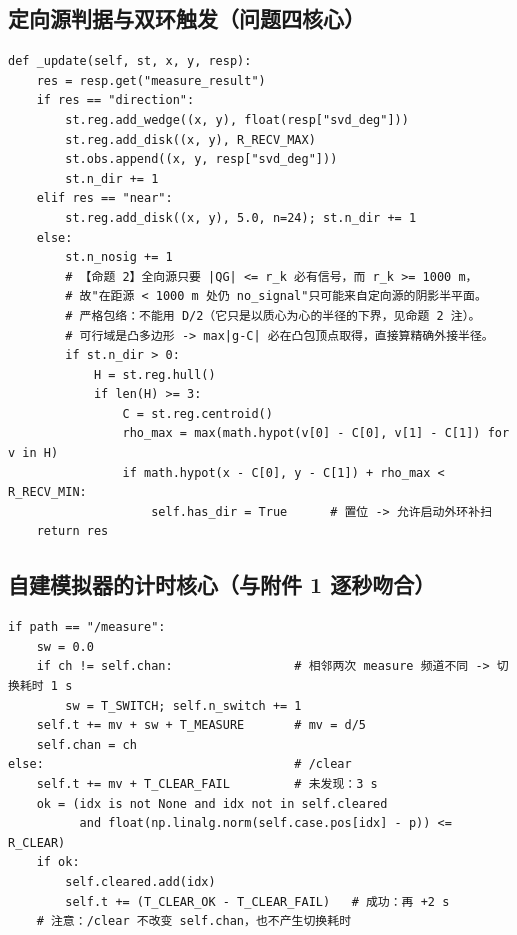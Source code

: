 \subsection{定向源判据与双环触发（问题四核心）}

\begin{verbatim}
def _update(self, st, x, y, resp):
    res = resp.get("measure_result")
    if res == "direction":
        st.reg.add_wedge((x, y), float(resp["svd_deg"]))
        st.reg.add_disk((x, y), R_RECV_MAX)
        st.obs.append((x, y, resp["svd_deg"]))
        st.n_dir += 1
    elif res == "near":
        st.reg.add_disk((x, y), 5.0, n=24); st.n_dir += 1
    else:
        st.n_nosig += 1
        # 【命题 2】全向源只要 |QG| <= r_k 必有信号，而 r_k >= 1000 m，
        # 故"在距源 < 1000 m 处仍 no_signal"只可能来自定向源的阴影半平面。
        # 严格包络：不能用 D/2（它只是以质心为心的半径的下界，见命题 2 注）。
        # 可行域是凸多边形 -> max|g-C| 必在凸包顶点取得，直接算精确外接半径。
        if st.n_dir > 0:
            H = st.reg.hull()
            if len(H) >= 3:
                C = st.reg.centroid()
                rho_max = max(math.hypot(v[0] - C[0], v[1] - C[1]) for v in H)
                if math.hypot(x - C[0], y - C[1]) + rho_max < R_RECV_MIN:
                    self.has_dir = True      # 置位 -> 允许启动外环补扫
    return res
\end{verbatim}

\subsection{自建模拟器的计时核心（与附件 1 逐秒吻合）}

\begin{verbatim}
if path == "/measure":
    sw = 0.0
    if ch != self.chan:                 # 相邻两次 measure 频道不同 -> 切换耗时 1 s
        sw = T_SWITCH; self.n_switch += 1
    self.t += mv + sw + T_MEASURE       # mv = d/5
    self.chan = ch
else:                                   # /clear
    self.t += mv + T_CLEAR_FAIL         # 未发现：3 s
    ok = (idx is not None and idx not in self.cleared
          and float(np.linalg.norm(self.case.pos[idx] - p)) <= R_CLEAR)
    if ok:
        self.cleared.add(idx)
        self.t += (T_CLEAR_OK - T_CLEAR_FAIL)   # 成功：再 +2 s
    # 注意：/clear 不改变 self.chan，也不产生切换耗时
\end{verbatim}

